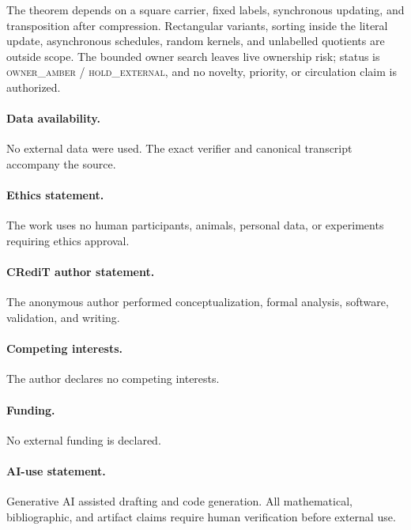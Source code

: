 \documentclass[a4paper,10pt]{amsart}
\theoremstyle{remark}
\begin{document}
The theorem depends on a square carrier, fixed labels, synchronous updating,
and transposition after compression.  Rectangular variants, sorting inside
the literal update, asynchronous schedules, random kernels, and unlabelled
quotients are outside scope.  The bounded owner search leaves live ownership
risk; status is \textsc{owner\_amber / hold\_external}, and no novelty,
priority, or circulation claim is authorized.

\paragraph{Data availability.}
No external data were used.  The exact verifier and canonical transcript
accompany the source.
\paragraph{Ethics statement.}
The work uses no human participants, animals, personal data, or experiments
requiring ethics approval.
\paragraph{CRediT author statement.}
The anonymous author performed conceptualization, formal analysis, software,
validation, and writing.
\paragraph{Competing interests.}
The author declares no competing interests.
\paragraph{Funding.}
No external funding is declared.
\paragraph{AI-use statement.}
Generative AI assisted drafting and code generation.  All mathematical,
bibliographic, and artifact claims require human verification before external
use.



\end{document}
